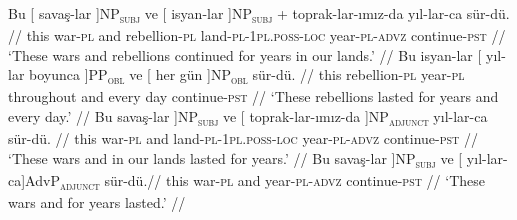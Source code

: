 \pex[exno=TS4,glspace=!1em,everygla={},everyglb={},aboveglbskip=-.15ex, interpartskip=15pt]
\label{TS4}
\a 
\begingl
\gla  Bu {[} {savaş-lar }]NP\textsubscript{\textsc{subj}} ve {[} {isyan-lar }]NP\textsubscript{\textsc{subj}} + toprak-lar-ımız-da yıl-lar-ca sür-dü. //
\glb this war-\textsc{pl} and rebellion-\textsc{pl} land-\textsc{pl}-\textsc{1pl.poss}-\textsc{loc} year-\textsc{pl}-\textsc{advz} continue-\textsc{pst} //
\glft `These wars and rebellions continued for years in our lands.' //
\endgl
\a
\begingl
\gla Bu isyan-lar {[} yıl-lar { boyunca }]PP\textsubscript{\textsc{obl}} ve {[} her { gün }]NP\textsubscript{\textsc{obl}} sür-dü. //
\glb this rebellion-\textsc{pl} year-\textsc{pl} throughout and every day continue-\textsc{pst} // 
\glft `These rebellions lasted for years and every day.' //
\endgl
\a
\begingl
\gla {[} Bu  {savaş-lar }]NP\textsubscript{\textsc{subj}} ve {[} {toprak-lar-ımız-da }]NP\textsubscript{\textsc{adjunct}} yıl-lar-ca sür-dü. //
\glb this war-\textsc{pl} and land-\textsc{pl}-\textsc{1pl.poss}-\textsc{loc} year-\textsc{pl}-\textsc{advz} continue-\textsc{pst} //
\glft `These wars and in our lands lasted for years.' //
\endgl
\a
\begingl
\gla {[} Bu  {savaş-lar }]NP\textsubscript{\textsc{subj}} ve {[} {yıl-lar-ca}]AdvP\textsubscript{\textsc{adjunct}} sür-dü.//
\glb this war-\textsc{pl} and year-\textsc{pl}-\textsc{advz} continue-\textsc{pst} //
\glft `These wars and for years lasted.' //
\endgl
\xe



